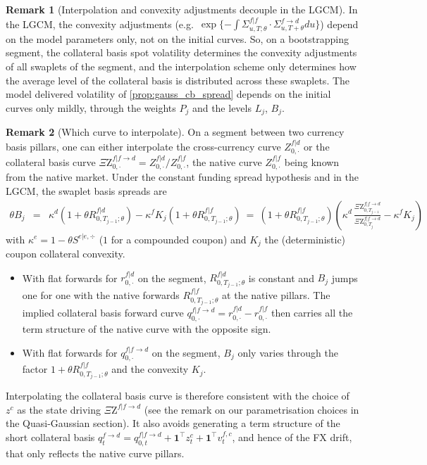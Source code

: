 \documentclass[11pt,english]{amsart}
\newcommand{\vun}{\mathbf{1}}
\newcommand{\QZ}{{\Xi\mathrm{Z}}}
\theoremstyle{definition}
\newtheorem{rema}{Remark}
\begin{document}
\begin{rema}[Interpolation and convexity adjustments decouple in the LGCM]
In the LGCM, the convexity adjustments (e.g.\ $\exp\{-\int\Sigma^{f|f}_{u,T;\theta}\cdot\Sigma^{f\to d}_{u,T+\theta}du\}$) depend on the model parameters only, not on the initial curves. So, on a bootstrapping segment, the collateral basis spot volatility determines the convexity adjustments of all swaplets of the segment, and the interpolation scheme only determines how the average level of the collateral basis is distributed across these swaplets. The model delivered volatility of \autoref{prop:gauss_cb_spread} depends on the initial curves only mildly, through the weights $P_j$ and the levels $L_j$, $B_j$.
\end{rema}

\begin{rema}[Which curve to interpolate]
On a segment between two currency basis pillars, one can either interpolate the cross-currency curve $Z^{f|d}_{0,\cdot}$ or the collateral basis curve $\QZ^{f|f\to d}_{0,\cdot} = Z^{f|d}_{0,\cdot}/Z^{f|f}_{0,\cdot}$, the native curve $Z^{f|f}_{0,\cdot}$ being known from the native market. Under the constant funding spread hypothesis and in the LGCM, the swaplet basis spreads are
\begin{eqnarray*}
  \theta B_{j} &=& \kappa^d (1+\theta R^{f|d}_{0,T_{j-1};\theta}) - \kappa^f K_j (1+\theta R^{f|f}_{0,T_{j-1};\theta}) 
  ~=~ (1+\theta R^{f|f}_{0,T_{j-1};\theta}) \left( \kappa^d\, \frac{\QZ^{f|f\to d}_{0,T_{j-1}}}{\QZ^{f|f\to d}_{0,T_j}} - \kappa^f K_j \right) 
\end{eqnarray*}
with $\kappa^e = 1-\theta S^{e|e,\div}$ ($1$ for a compounded coupon) and $K_j$ the (deterministic) coupon collateral convexity.
\begin{itemize}
\item With flat forwards for $r^{f|d}_{0,\cdot}$ on the segment, $R^{f|d}_{0,T_{j-1};\theta}$ is constant and $B_j$ jumps one for one with the native forwards $R^{f|f}_{0,T_{j-1};\theta}$ at the native pillars. The implied collateral basis forward curve $q^{f|f\to d}_{0,\cdot} = r^{f|d}_{0,\cdot} - r^{f|f}_{0,\cdot}$ then carries all the term structure of the native curve with the opposite sign.
\item With flat forwards for $q^{f|f\to d}_{0,\cdot}$ on the segment, $B_j$ only varies through the factor $1+\theta R^{f|f}_{0,T_{j-1};\theta}$ and the convexity $K_j$.
\end{itemize}
Interpolating the collateral basis curve is therefore consistent with the choice of $z^c$ as the state driving $\QZ^{f|f\to d}$ (see the remark on our parametrisation choices in the Quasi-Gaussian section). It also avoids generating a term structure of the short collateral basis $q^{f\to d}_t = q^{f|f\to d}_{0,t} + \vun^\top z^c_t + \vun^\top v^{f,c}_t$, and hence of the FX drift, that only reflects the native curve pillars.
\end{rema}
\end{document}

